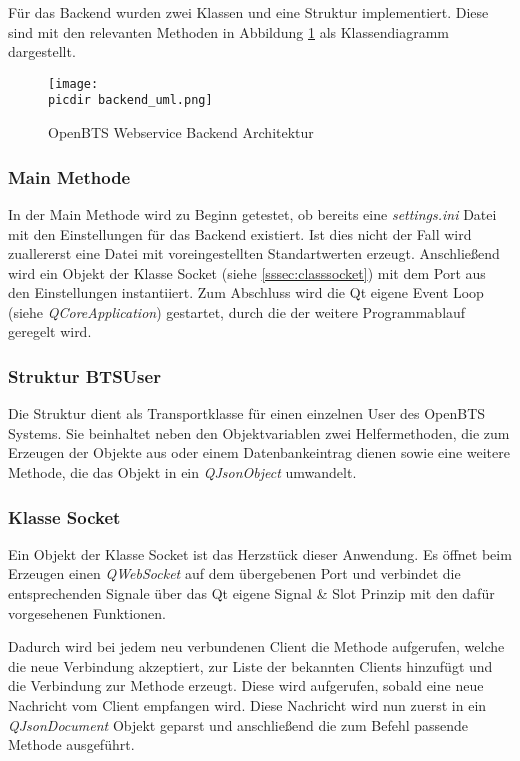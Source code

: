 Für das Backend wurden zwei Klassen und eine Struktur implementiert. Diese sind mit den relevanten Methoden in Abbildung \ref{fig:uml_class} als \UML Klassendiagramm dargestellt.
\begin{figure}[h!]
	\centering
	\texttt{[image: \\picdir backend\_uml.png]}
	\caption{OpenBTS Webservice Backend Architektur}
	\label{fig:uml_class}
\end{figure}

\subsubsection*{Main Methode}

In der Main Methode wird zu Beginn getestet, ob bereits eine \textit{settings.ini} Datei mit den Einstellungen für das Backend existiert. Ist dies nicht der Fall wird zuallererst eine Datei mit voreingestellten Standartwerten erzeugt. Anschließend wird ein Objekt der Klasse Socket (siehe \ref{sssec:classsocket}) mit dem Port aus den Einstellungen instantiiert. Zum Abschluss wird die Qt eigene Event Loop (siehe \textit{QCoreApplication}) gestartet, durch die der weitere Programmablauf geregelt wird.

\subsubsection*{Struktur BTSUser}
Die Struktur dient als Transportklasse für einen einzelnen User des OpenBTS Systems. Sie beinhaltet neben den Objektvariablen zwei Helfermethoden, die zum Erzeugen der Objekte aus \JSON oder einem Datenbankeintrag dienen sowie eine weitere Methode, die das Objekt in ein \textit{QJsonObject} umwandelt.


\subsubsection*{Klasse Socket}
\label{sssec:classsocket}
Ein Objekt der Klasse Socket ist das Herzstück dieser Anwendung. Es öffnet beim Erzeugen einen \textit{QWebSocket} auf dem übergebenen Port und verbindet die entsprechenden Signale über das Qt eigene Signal \& Slot Prinzip mit den dafür vorgesehenen Funktionen.

Dadurch wird bei jedem neu verbundenen Client die Methode  aufgerufen, welche die neue Verbindung akzeptiert, zur Liste der bekannten Clients hinzufügt und die Verbindung zur  Methode erzeugt. Diese wird aufgerufen, sobald eine neue Nachricht vom Client empfangen wird. Diese Nachricht wird nun zuerst in ein \textit{QJsonDocument} Objekt geparst und anschließend die zum Befehl passende Methode ausgeführt.


